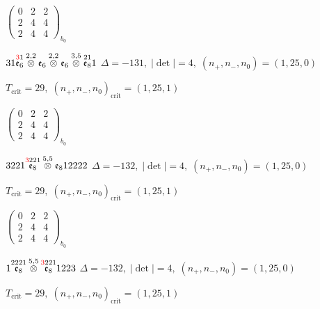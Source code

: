 \documentclass[10pt]{article}
\begin{document}
\hspace{2em}$\left(\begin{smallmatrix}0 & 2 & 2 \\ 2 & 4 & 4 \\ 2 & 4 & 4\end{smallmatrix}\right)_{\!b_0}$

\smallskip

$31\overset{\textcolor{red}{3}1}{\mathfrak{e}_6}\overset{2,2}{\otimes}\mathfrak{e}_6\overset{2,2}{\otimes}\mathfrak{e}_6\overset{3,5}{\otimes}\overset{21}{\mathfrak{e}_8}1$ \quad $\Delta=-131,\; |\det|=4,\; (n_+,n_-,n_0)=(1,25,0)$

\hspace{1em}$T_{\text{crit}}=29,\; (n_+,n_-,n_0)_{\text{crit}}=(1,25,1)$

\hspace{2em}$\left(\begin{smallmatrix}0 & 2 & 2 \\ 2 & 4 & 4 \\ 2 & 4 & 4\end{smallmatrix}\right)_{\!b_0}$

\smallskip

$3221\overset{\textcolor{red}{3}221}{\mathfrak{e}_8}\overset{5,5}{\otimes}\mathfrak{e}_812222$ \quad $\Delta=-132,\; |\det|=4,\; (n_+,n_-,n_0)=(1,25,0)$

\hspace{1em}$T_{\text{crit}}=29,\; (n_+,n_-,n_0)_{\text{crit}}=(1,25,1)$

\hspace{2em}$\left(\begin{smallmatrix}0 & 2 & 2 \\ 2 & 4 & 4 \\ 2 & 4 & 4\end{smallmatrix}\right)_{\!b_0}$

\smallskip

$1\overset{2221}{\mathfrak{e}_8}\overset{5,5}{\otimes}\overset{\textcolor{red}{3}221}{\mathfrak{e}_8}1223$ \quad $\Delta=-132,\; |\det|=4,\; (n_+,n_-,n_0)=(1,25,0)$

\hspace{1em}$T_{\text{crit}}=29,\; (n_+,n_-,n_0)_{\text{crit}}=(1,25,1)$
\end{document}
